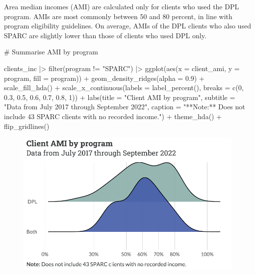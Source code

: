 \documentclass[
  letterpaper,
  DIV=11,
  numbers=noendperiod]{scrartcl}
\newenvironment{Shaded}{\begin{snugshade}}{\end{snugshade}}
\newcommand{\AttributeTok}[1]{\textcolor[rgb]{0.40,0.45,0.13}{#1}}
\newcommand{\CommentTok}[1]{\textcolor[rgb]{0.37,0.37,0.37}{#1}}
\newcommand{\DecValTok}[1]{\textcolor[rgb]{0.68,0.00,0.00}{#1}}
\newcommand{\FloatTok}[1]{\textcolor[rgb]{0.68,0.00,0.00}{#1}}
\newcommand{\FunctionTok}[1]{\textcolor[rgb]{0.28,0.35,0.67}{#1}}
\newcommand{\NormalTok}[1]{\textcolor[rgb]{0.00,0.23,0.31}{#1}}
\newcommand{\SpecialCharTok}[1]{\textcolor[rgb]{0.37,0.37,0.37}{#1}}
\newcommand{\StringTok}[1]{\textcolor[rgb]{0.13,0.47,0.30}{#1}}
\begin{document}
Area median incomes (AMI) are calculated only for clients who used the
DPL program. AMIs are most commonly between 50 and 80 percent, in line
with program eligibility guidelines. On average, AMIs of the DPL clients
who also used SPARC are slightly lower than those of clients who used
DPL only.

\begin{Shaded}
\begin{Highlighting}[]
\CommentTok{\# Summarise AMI by program}

\NormalTok{clients\_inc }\SpecialCharTok{|\textgreater{}} \FunctionTok{filter}\NormalTok{(program }\SpecialCharTok{!=} \StringTok{"SPARC"}\NormalTok{) }\SpecialCharTok{|\textgreater{}} 
\FunctionTok{ggplot}\NormalTok{(}\FunctionTok{aes}\NormalTok{(}\AttributeTok{x =}\NormalTok{ client\_ami, }\AttributeTok{y =}\NormalTok{ program, }\AttributeTok{fill =}\NormalTok{ program)) }\SpecialCharTok{+}
  \FunctionTok{geom\_density\_ridges}\NormalTok{(}\AttributeTok{alpha =} \FloatTok{0.9}\NormalTok{) }\SpecialCharTok{+}
  \FunctionTok{scale\_fill\_hda}\NormalTok{() }\SpecialCharTok{+}
  \FunctionTok{scale\_x\_continuous}\NormalTok{(}\AttributeTok{labels =} \FunctionTok{label\_percent}\NormalTok{(), }\AttributeTok{breaks =} \FunctionTok{c}\NormalTok{(}\DecValTok{0}\NormalTok{, }\FloatTok{0.3}\NormalTok{, }\FloatTok{0.5}\NormalTok{, }\FloatTok{0.6}\NormalTok{, }\FloatTok{0.7}\NormalTok{, }\FloatTok{0.8}\NormalTok{, }\DecValTok{1}\NormalTok{)) }\SpecialCharTok{+}
  \FunctionTok{labs}\NormalTok{(}\AttributeTok{title =} \StringTok{"Client AMI by program"}\NormalTok{,}
       \AttributeTok{subtitle =} \StringTok{"Data from July 2017 through September 2022"}\NormalTok{,}
       \AttributeTok{caption =} \StringTok{"**Note:** Does not include 43 SPARC clients with no recorded income."}\NormalTok{) }\SpecialCharTok{+}
  \FunctionTok{theme\_hda}\NormalTok{() }\SpecialCharTok{+}
  \FunctionTok{flip\_gridlines}\NormalTok{()}
\end{Highlighting}
\end{Shaded}

\begin{figure}[H]

{\centering \includegraphics{piedmont_files/figure-pdf/ami-1.pdf}

}

\end{figure}
\end{document}
